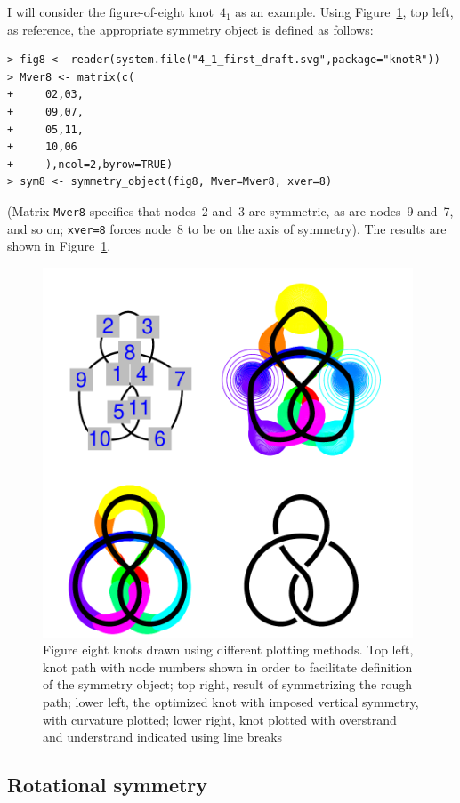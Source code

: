 \documentclass{birkjour}
\theoremstyle{definition}
\theoremstyle{remark}
\numberwithin{equation}{section}
\begin{document}
I will consider the figure-of-eight knot~$4_1$ as an example.  Using
Figure~\ref{four_figure_8_knots}, top left, as reference, the
appropriate symmetry object is defined as follows:

\begin{verbatim}
> fig8 <- reader(system.file("4_1_first_draft.svg",package="knotR"))
> Mver8 <- matrix(c(
+     02,03,
+     09,07,
+     05,11,
+     10,06
+     ),ncol=2,byrow=TRUE)
> sym8 <- symmetry_object(fig8, Mver=Mver8, xver=8)
\end{verbatim}

(Matrix {\tt Mver8} specifies that nodes~2 and~3 are symmetric, as
are nodes~9 and~7, and so on; {\tt xver=8} forces node~8 to be on the
axis of symmetry).  The results are shown in
Figure~\ref{four_figure_8_knots}.

\begin{figure}[!tbp]
  \centering
\includegraphics[width=11cm]{knot-four_figure_eight_knots}
\caption{Figure eight knots drawn using different plotting methods.
  Top left, knot path with node numbers shown in order to facilitate
    \label{four_figure_8_knots} definition of the symmetry object; top
    right, result of symmetrizing the rough path; lower left, the
    optimized knot with imposed vertical symmetry, with curvature
    plotted; lower right, knot plotted with overstrand and understrand
    indicated using line breaks}
\end{figure}


  
\subsection{Rotational symmetry}
\end{document}
